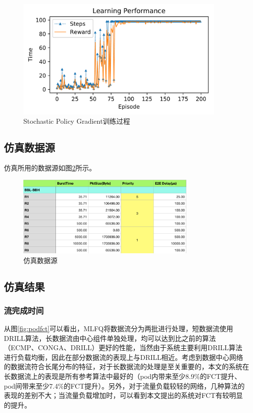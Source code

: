 \begin{figure}[ht]
\centering
\includegraphics[height=6cm]{figure/cognitive-learning.png}
\caption{Stochastic Policy Gradient训练过程}
\label{fig:cognitive}
\end{figure}
\subsection{仿真数据源}
仿真所用的数据源如图\ref{fig:datasource}所示。
\begin{figure}[ht]
\centering
\includegraphics[height=4cm]{figure/source.png}
\caption{仿真数据源}
\label{fig:datasource}
\end{figure}

\subsection{仿真结果}
\subsubsection{流完成时间}
从图\ref{fig:podfct}可以看出，MLFQ将数据流分为两批进行处理，短数据流使用DRILL算法，长数据流由中心组件单独处理，均可以达到比之前的算法（ECMP、CONGA、DRILL）更好的性能，当然由于系统主要利用DRILL算法进行负载均衡，因此在部分数据流的表现上与DRILL相近。考虑到数据中心网络的数据流符合长尾分布的特征，对于长数据流的处理是至关重要的，本文的系统在长数据流上的表现是所有参考算法中最好的（pod内带来至少8.9\%的FCT提升、pod间带来至少7.4\%的FCT提升）。另外，对于流量负载较轻的网络，几种算法的表现的差别不大；当流量负载增加时，可以看到本文提出的系统对FCT有较明显的提升。

